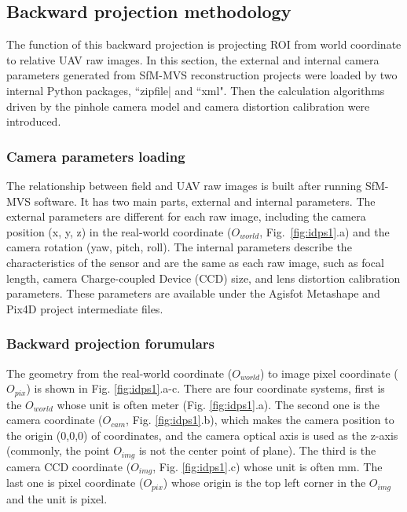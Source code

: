 \subsection{Backward projection methodology}
\label{spp:backward}

% 

The function of this backward projection is projecting ROI from world coordinate to relative UAV raw images. In this section, the external and internal camera parameters generated from SfM-MVS reconstruction projects were loaded by two internal Python packages, ``zipfile| and ``xml". Then the calculation algorithms driven by the pinhole camera model and camera distortion calibration were introduced.

\subsubsection*{Camera parameters loading}

The relationship between field and UAV raw images is built after running SfM-MVS software. It has two main parts, external and internal parameters. The external parameters are different for each raw image, including the camera position (x, y, z) in the real-world coordinate ($O_{world}$, Fig.~\ref{fig:idps1}.a) and the camera rotation (yaw, pitch, roll). The internal parameters describe the characteristics of the sensor and are the same as each raw image, such as focal length, camera Charge-coupled Device (CCD) size, and lens distortion calibration parameters. These parameters are available under the Agisfot Metashape and Pix4D project intermediate files.

\subsubsection*{Backward projection forumulars}

The geometry from the real-world coordinate ($O_{world}$) to image pixel coordinate ($O_{pix}$) is shown in Fig. \ref{fig:idps1}.a-c. There are four coordinate systems, first is the $O_{world}$ whose unit is often meter (Fig. \ref{fig:idps1}.a). The second one is the camera coordinate ($O_{cam}$, Fig. \ref{fig:idps1}.b), which makes the camera position to the origin (0,0,0) of coordinates, and the camera optical axis is used as the z-axis (commonly, the point $O_{img}$ is not the center point of plane). The third is the camera CCD coordinate ($O_{img}$, Fig. \ref{fig:idps1}.c) whose unit is often mm. The last one is pixel coordinate ($O_{pix}$) whose origin is the top left corner in the $O_{img}$ and the unit is pixel.

